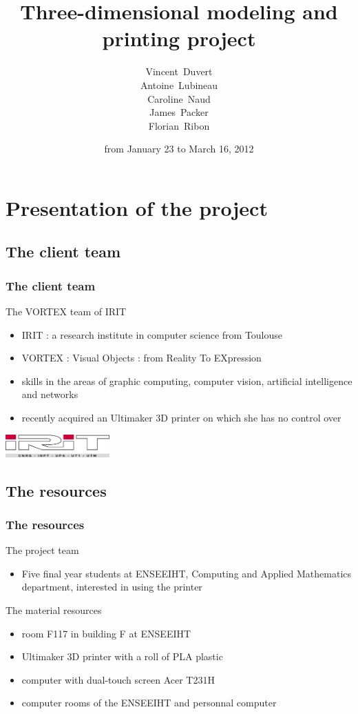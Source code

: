 \documentclass{beamer}
\title{Three-dimensional modeling and printing project}
\subtitle{}
\author[V. D., A. L., C. N., J. P., F. R.]{\begin{scriptsize}
Vincent~Duvert \\ Antoine~Lubineau \\ Caroline~Naud \\ James~Packer \\ Florian~Ribon\end{scriptsize}}
\date{from January 23 to March 16, 2012}
\begin{document}
\frame{\titlepage}

\section{Presentation of the project}

\subsection{The client team}
\begin{frame}
	\frametitle{The client team}
	
	\begin{block}{The \textsc{VORTEX} team of IRIT}
		\begin{itemize}
		\item \textsc{IRIT} : a research institute in computer science from Toulouse
		\item \textsc{VORTEX} : Visual Objects : from Reality To EXpression
		\item skills in the areas of graphic computing,  computer vision, artificial intelligence and networks
		\item recently acquired an Ultimaker 3D printer on which she has no control over
		\end{itemize}
    \end{block}
    
    \begin{center}
		\includegraphics[width=4cm]{irit}	
	\end{center}
    
\end{frame}

\subsection{The resources}
\begin{frame}
	\frametitle{The resources}
	
	\begin{block}{The project team}
		\begin{itemize}
		\item Five final year students at ENSEEIHT, Computing and Applied Mathematics department, interested in using the printer
		\end{itemize}
    \end{block}
    
    \begin{block}{The material resources}
    	\begin{itemize}
		\item room F117 in building F at ENSEEIHT
    	\item Ultimaker 3D printer with a roll of PLA plastic
    	\item computer with dual-touch screen Acer T231H
    	\item computer rooms of the ENSEEIHT and personnal computer
		\end{itemize}
    \end{block}
      
\end{frame}
\end{document}
